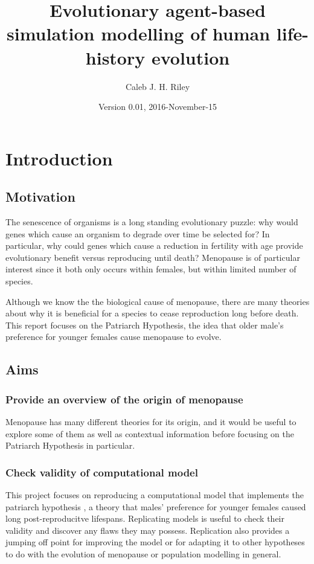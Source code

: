 \documentclass[authoryearcitations]{UoYCSproject}
\author{Caleb J. H. Riley}
\title{Evolutionary agent-based simulation modelling of human life-history evolution}
\date{Version 0.01, 2016-November-15}
\begin{document}
\maketitle
\listoffigures
\listoftables

\cleardoublepage

\chapter{Introduction}
\label{cha:Introduction}
\section{Motivation}
The senescence of organisms is a long standing evolutionary puzzle: why would genes which cause an organism to degrade over time be selected for? In particular, why could genes which cause a reduction in fertility with age provide evolutionary benefit versus reproducing until death? Menopause is of particular interest since it both only occurs within females, but within limited number of species.

Although we know the the biological cause of menopause, there are many theories about why it is beneficial for a species to cease reproduction long before death. This report focuses on the Patriarch Hypothesis, the idea that older male's preference for younger females cause menopause to evolve. 


\section{Aims}
\subsection{Provide an overview of the origin of menopause}
Menopause has many different theories for its origin, and it would be useful to explore some of them as well as contextual information before focusing on the Patriarch Hypothesis in particular.


\subsection{Check validity of computational model}
This project focuses on reproducing a computational model \cite{mateChoice2013} that implements the patriarch hypothesis \cite{patriarchHypothesis2000}, a theory that males' preference for younger females caused long post-reproducitve lifespans. Replicating models is useful to check their validity and discover any flaws they may possess. Replication also provides a jumping off point for improving the model or for adapting it to other hypotheses to do with the evolution of menopause or population modelling in general. 
\end{document}
